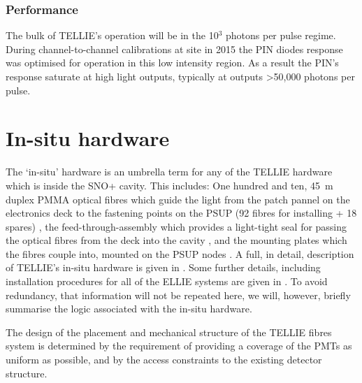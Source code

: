\documentclass[12pt]{report}
\begin{document}
\subsection{Performance}
The bulk of TELLIE's operation will be in the 10$^3$ photons per pulse regime. During channel-to-channel calibrations at site in 2015 the PIN diodes response was optimised for operation in this low intensity region. As a result the PIN's response saturate at high light outputs, typically at outputs \textgreater 50,000 photons per pulse. 

\chapter{In-situ hardware}
\label{chap:inSitu}
The `in-situ' hardware is an umbrella term for any of the TELLIE hardware which is inside the SNO+ cavity. This includes: One hundred and ten, 45~m duplex PMMA optical fibres which guide the light from the patch pannel on the electronics deck to the fastening points on the PSUP (92 fibres for installing + 18 spares) \cite{tellieFibreHardware}, the feed-through-assembly which provides a light-tight seal for passing the optical fibres from the deck into the cavity \cite{feedThroughDrawings}, and the mounting plates which the fibres couple into, mounted on the PSUP nodes \cite{telliePlatesDrawings} \cite{amelliePlatesDrawings}. A full, in detail, description of TELLIE's in-situ hardware is given in \cite{tellieFibreHardware}. Some further details, including installation procedures for all of the ELLIE systems are given in \cite{ellieInstall}. To avoid redundancy, that information will not be repeated here, we will, however, briefly summarise the logic associated with the in-situ hardware. 

The design of the placement and mechanical structure of the TELLIE fibres system is determined by the requirement of providing a coverage of the PMTs as uniform as possible, and by the access constraints to the existing detector structure. 
\end{document}
